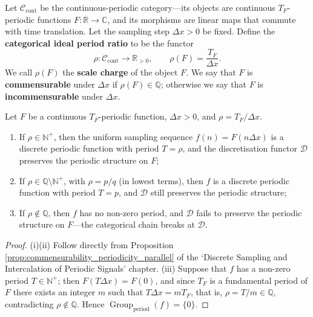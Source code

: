\begin{definition}\label{def:ideal_period_ratio_categorical}
Let $\mathcal{C}_{\text{cont}}$ be the continuous-periodic category---its objects are continuous $T_F$-periodic functions $F:\mathbb{R}\to\mathbb{C}$, and its morphisms are linear maps that commute with time translation. Let the sampling step $\Delta x > 0$ be fixed. Define the \textbf{categorical ideal period ratio} to be the functor
\[
\rho:\mathcal{C}_{\text{cont}}\to\mathbb{R}_{>0},\qquad
\rho(F)=\frac{T_F}{\Delta x}.
\]
We call $\rho(F)$ the \textbf{scale charge} of the object $F$. We say that $F$ is \textbf{commensurable} under $\Delta x$ if $\rho(F)\in\mathbb{Q}$; otherwise we say that $F$ is \textbf{incommensurable} under $\Delta x$.
\end{definition}

\begin{proposition}\label{prop:commensurability_gap}
Let $F$ be a continuous $T_F$-periodic function, $\Delta x>0$, and $\rho = T_F/\Delta x$.
\begin{enumerate}[label=(\roman*)]
    \item If $\rho\in\mathbb{N}^+$, then the uniform sampling sequence $f(n)=F(n\Delta x)$ is a discrete periodic function with period $T=\rho$, and the discretisation functor $\mathcal{D}$ preserves the periodic structure on $F$;
    \item If $\rho\in\mathbb{Q}\setminus\mathbb{N}^+$, with $\rho=p/q$ (in lowest terms), then $f$ is a discrete periodic function with period $T=p$, and $\mathcal{D}$ still preserves the periodic structure;
    \item If $\rho\notin\mathbb{Q}$, then $f$ has no non-zero period, and $\mathcal{D}$ fails to preserve the periodic structure on $F$---the categorical chain breaks at $\mathcal{D}$.
\end{enumerate}
\end{proposition}

\begin{proof}
(i)(ii) Follow directly from Proposition \ref{prop:commensurability_periodicity_parallel} of the `Discrete Sampling and Intercalation of Periodic Signals' chapter. (iii) Suppose that $f$ has a non-zero period $T\in\mathbb{N}^+$; then $F(T\Delta x)=F(0)$, and since $T_F$ is a fundamental period of $F$ there exists an integer $m$ such that $T\Delta x=mT_F$, that is, $\rho=T/m\in\mathbb{Q}$, contradicting $\rho\notin\mathbb{Q}$. Hence $\operatorname{Group}_{\mathrm{period}}(f)=\{0\}$.
\end{proof}

